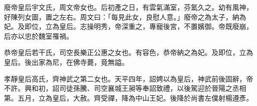 \begin{pinyinscope}
 廢帝皇后宇文氏，周文帝女也。后初產之日，有雲氣滿室，芬氳久之。幼有風神，好陳列女圖，置之左右。周文曰：「每見此女，良慰人意。」廢帝之為太子，納為妃。及即位，立為皇后。志操明秀，帝深重之，專寵後宮，不置嬪御。帝既廢崩，后亦以忠於魏室罹禍。



 恭帝皇后若干氏，司空長樂正公惠之女也。有容色，恭帝納之為妃。及即位，立為皇后。後出家為尼，在佛寺薨，竟無謚。



 孝靜皇后高氏，齊神武之第二女也。天平四年，詔娉以為皇后，神武前後固辭，帝不許。興和初，詔司徒孫騰、司空襄城王昶等奉詔致禮，以後駕迎於晉陽之丞相第。五月，立為皇后，大赦。齊受禪，降為中山王妃。後降於尚書左僕射楊遵彥。



\end{pinyinscope}